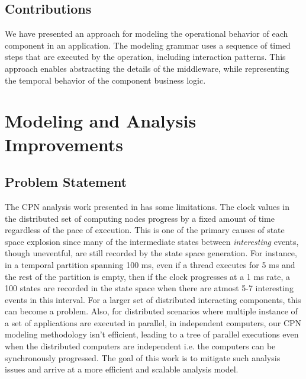 \subsection{Contributions}
We have presented an approach \cite{SEUS} for modeling the operational behavior of each component in an application. The modeling grammar uses a sequence of timed steps that are executed by the operation, including interaction patterns. This approach enables abstracting the details of the middleware, while representing the temporal behavior of the component business logic.

\newpage

\section{Modeling and Analysis Improvements}
\label{sec:Improvements}

\subsection{Problem Statement}

The CPN analysis work presented in \cite{kumar2014colored} has some limitations. The clock values in the distributed set of computing nodes progress by a fixed amount of time regardless of the pace of execution. This is one of the primary causes of state space explosion since many of the intermediate states between \emph{interesting} events, though uneventful, are still recorded by the state space generation. For instance, in a temporal partition spanning 100 ms, even if a thread executes for 5 ms and the rest of the partition is empty, then if the clock progresses at a 1 ms rate, a 100 states are recorded in the state space when there are atmost 5-7 interesting events in this interval. For a larger set of distributed interacting components, this can become a problem. Also, for distributed scenarios where multiple instance of a set of applications are executed in parallel, in independent computers, our CPN modeling methodology isn't efficient, leading to a tree of parallel executions even when the distributed computers are independent i.e. the computers can be synchronously progressed. The goal of this work is to mitigate such analysis issues and arrive at a more efficient and scalable analysis model. 

